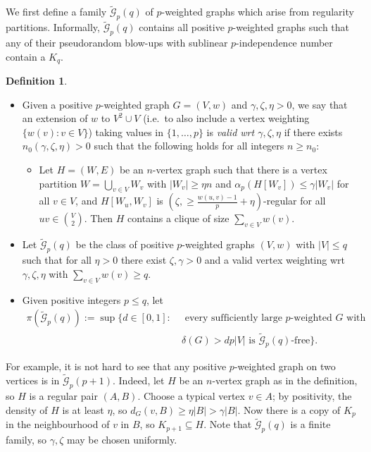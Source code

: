 \documentclass[11pt, a4paper]{article}
\theoremstyle{definition}
\newtheorem{definition}[theorem]{Definition}
\def\eps{{\varepsilon}}
\newcommand{\cG}{\mathcal{G}}
\begin{document}
We first define a family $\widetilde{\cG}_p(q)$ of $p$-weighted graphs which arise from regularity partitions.
Informally, $\widetilde{\cG}_p(q)$ contains all positive $p$-weighted graphs such that any of their pseudorandom blow-ups with sublinear $p$-independence number contain a $K_q$. 

\begin{definition}\label{def:Gpq}
	~
	
	\vspace{-0.3cm}
	\begin{itemize}
		\item Given a positive $p$-weighted graph $G=(V,w)$ and $\gamma,\zeta,\eta>0$, we say that an extension of $w$ to $V^2 \cup V$ (i.e.~to also include a vertex weighting $\lbrace w(v) : v \in V\rbrace$) taking values in $\lbrace 1,\ldots,p\rbrace$ is \emph{valid wrt $\gamma,\zeta,\eta$} if there exists $n_0(\gamma,\zeta,\eta)>0$ such that the following holds for all integers $n \geq n_0$:
		\begin{itemize}
			\item[] 
			Let $H = (W,E)$ be an $n$-vertex graph such that
			there is a vertex partition $W=\bigcup_{v \in V}W_v$ with $|W_v| \geq \eta n$ and $\alpha_p(H[W_v])\le \gamma|W_v|$ for all $v \in V$, and
			$H[W_u,W_v]$ is $(\zeta,\geq\!\frac{w(u,v)-1}{p}+\eta)$-regular for all $uv\in{V\choose 2}$.
			Then $H$ contains a clique of size $\sum_{v \in V}w(v)$.
		\end{itemize}
		
		\item Let $\widetilde{\mathcal{G}}_p(q)$ be the class of positive $p$-weighted graphs $(V,w)$ with $|V| \leq q$ such that for all $\eta>0$ there exist $\zeta,\gamma>0$ and a valid vertex weighting wrt $\gamma,\zeta,\eta$ with $\sum_{v \in V}w(v) \geq q$.
		\item Given positive integers $p \leq q$, let
		\begin{align*}
			\pi(\widetilde{\cG}_p(q)):=\sup\{d \in [0,1]:~&\text{ every sufficiently large } p\text{-weighted }G \text{ with }\\
			&\delta(G) > dp|V| \text{ is } \widetilde{\cG}_p(q)\text{-free} \}.
		\end{align*} 
	\end{itemize}
\end{definition}
For example, it is not hard to see that any positive $p$-weighted graph on two vertices is in $\widetilde{\cG}_p(p+1)$. 
Indeed, let $H$ be an $n$-vertex graph as in the definition, so $H$ is a regular pair $(A,B)$. Choose a typical vertex $v \in A$; by positivity, the density of $H$ is at least $\eta$, so $d_G(v,B) \geq \eta|B| > \gamma|B|$.
Now there is a copy of $K_p$ in the neighbourhood of $v$ in $B$, so $K_{p+1} \subseteq H$.
Note that $\widetilde{\cG}_p(q)$ is a finite family, so $\gamma,\zeta$ may be chosen uniformly.
\end{document}
